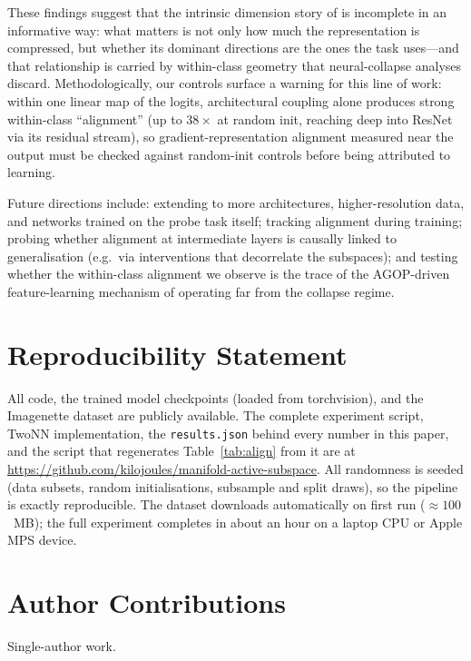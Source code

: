 \documentclass{article}
\begin{document}
These findings suggest that the intrinsic dimension story of
\citet{ansuini2019intrinsic} is incomplete in an informative way: what
matters is not only how much the representation is compressed, but whether
its dominant directions are the ones the task uses---and that relationship
is carried by within-class geometry that neural-collapse analyses discard.
Methodologically, our controls surface a warning for this line of work:
within one linear map of the logits, architectural coupling alone produces
strong within-class ``alignment'' (up to $38\times$ at random init, reaching
deep into ResNet via its residual stream), so gradient-representation
alignment measured near the output must be checked against random-init
controls before being attributed to learning.

Future directions include: extending to more architectures, higher-resolution
data, and networks trained on the probe task itself; tracking alignment
during training; probing whether alignment at intermediate layers is
causally linked to generalisation (e.g.\ via interventions that decorrelate
the subspaces); and testing whether the within-class alignment we observe is
the trace of the AGOP-driven feature-learning mechanism of
\citet{radhakrishnan2024mechanism,beaglehole2024agop} operating far from the
collapse regime.

\section*{Reproducibility Statement}

All code, the trained model checkpoints (loaded from torchvision), and the
Imagenette dataset are publicly available.  The complete experiment script,
TwoNN implementation, the \texttt{results.json} behind every number in this
paper, and the script that regenerates Table~\ref{tab:align} from it are at
\url{https://github.com/kilojoules/manifold-active-subspace}.
All randomness is seeded (data subsets, random initialisations, subsample
and split draws), so the pipeline is exactly reproducible.  The dataset
downloads automatically on first run ($\approx100$~MB); the full experiment
completes in about an hour on a laptop CPU or Apple MPS device.

\section*{Author Contributions}

Single-author work.



\end{document}
